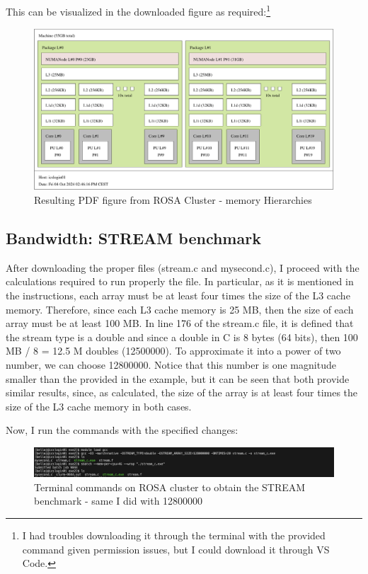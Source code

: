 \documentclass[unicode,11pt,a4paper,oneside,numbers=endperiod,openany]{scrartcl}
\begin{document}
This can be visualized in the downloaded figure as required:\footnote{I had troubles downloading it through the terminal with the provided command given permission issues, but I could download it through VS Code.} 

\begin{figure}[H]
    \centering
    \includegraphics[width=\textwidth]{./exercise2/XEON_E5-2650.pdf}
    \caption{Resulting PDF figure from ROSA Cluster - memory Hierarchies }
  \end{figure}

\subsection{Bandwidth: STREAM benchmark}
After downloading the proper files (stream.c and mysecond.c), I proceed with the calculations required to run properly the file.
In particular, as it is mentioned in the instructions, each array must be at least four times the size of the L3 cache memory.
Therefore, since each L3 cache memory is 25 MB, then the size of each array must be at least 100 MB. 
In line 176 of the stream.c file, it is defined that the stream type is a double and since a double in C is 8 bytes (64 bits), then 100 MB / 8 = 12.5 M doubles (12500000). 
To approximate it into a power of two number, we can choose 12800000. Notice that this number is one magnitude smaller than the provided in the example, but it can be seen that both provide similar
results, since, as calculated, the size of the array is at least four times the size of the L3 cache memory in both cases.

Now, I run the commands with the specified changes: 
\begin{figure}[H]
    \centering
    \includegraphics[width=\textwidth]{./exercise2/4.png}
    \caption{Terminal commands on ROSA cluster to obtain the STREAM benchmark - same I did with 12800000}
\end{figure}
\end{document}
